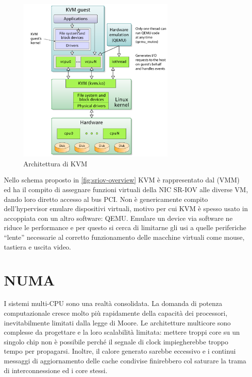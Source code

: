 \begin{figure}[htb]
    \includegraphics[width=0.7\textwidth]{graphics/kvm.png}
    \caption{Architettura di KVM}
    \label{fig:kvm-arch}
\end{figure}

Nello schema proposto in \cref{fig:sriov-overview} KVM è rappresentato dal  (VMM) ed ha il compito di assegnare funzioni virtuali della NIC SR-IOV alle diverse VM, dando loro diretto accesso al bus PCI. Non è genericamente compito dell'hypervisor emulare dispositivi virtuali, motivo per cui KVM è spesso usato in accoppiata con un altro software: QEMU. Emulare un device via software ne riduce le performance e per questo si cerca di limitarne gli usi a quelle periferiche ``lente'' necessarie al corretto funzionamento delle macchine virtuali come mouse, tastiera e uscita video.

\section{NUMA}

I sistemi multi-CPU sono una realtà consolidata. La domanda di potenza computazionale cresce molto più rapidamente della capacità dei processori, inevitabilmente limitati dalla legge di Moore. Le architetture multicore sono complesse da progettare e la loro scalabilità limitata: mettere troppi core su un singolo chip non è possibile perché il segnale di clock impiegherebbe troppo tempo per propagarsi. Inoltre, il calore generato sarebbe eccessivo e i continui messaggi di aggiornamento delle cache condivise finirebbero col saturare la trama di interconnessione ed i core stessi.

